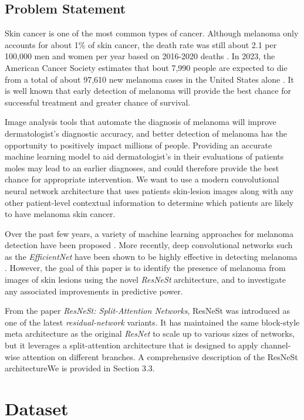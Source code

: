 \documentclass [MAS] {uclathes}
\begin{document}
\section{Problem Statement}

Skin cancer is one of the most common types of cancer. Although melanoma only accounts for about 1\% of skin cancer, the death rate was still about 2.1 per 100,000 men and women per year based on 2016-2020 deaths \cite{SEER}. In 2023, the American Cancer Society estimates that bout 7,990 people are expected to die from a total of about 97,610 new melanoma cases in the United States alone \cite{ACS}. It is well known that early detection of melanoma will provide the best chance for successful treatment and greater chance of survival. 

Image analysis tools that automate the diagnosis of melanoma will improve dermatologist's diagnostic accuracy, and better detection of melanoma has the opportunity to positively impact millions of people. Providing an accurate machine learning model to aid dermatologist's in their evaluations of patients moles may lead to an earlier diagnoses, and could therefore provide the best chance for appropriate intervention. We want to use a modern convolutional neural network architecture that uses patients skin-lesion images along with any other patient-level contextual information to determine which patients are likely to have melanoma skin cancer.

Over the past few years, a variety of machine learning approaches for melanoma detection have been proposed \cite{VariousMethods}. More recently, deep convolutional networks such as the \textit{EfficientNet} have been shown to be highly effective in detecting melanoma \cite{EffNet_MelDet}. However, the goal of this paper is to identify the presence of melanoma from images of skin lesions using the novel \textit{ResNeSt} architecture, and to investigate any associated improvements in predictive power.

From the paper \textit{ResNeSt: Split-Attention Networks}, ResNeSt was introduced as one of the latest \textit{residual-network} variants. It has maintained the same block-style meta architecture as the original \textit{ResNet} to scale up to various sizes of networks, but it leverages a split-attention architecture that is designed to apply channel-wise attention on different branches. A comprehensive description of the ResNeSt architectureWe is provided in Section 3.3.

\chapter{Dataset}
\end{document}
